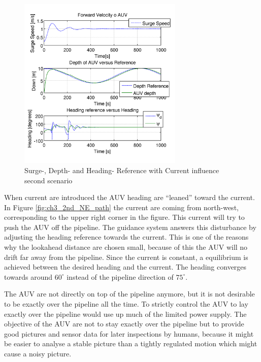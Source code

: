 		\begin{figure}[htbp]
			\centering
			\includegraphics[width=0.70\textwidth]{pics/2nd_uDpsi}
			\caption{Surge-, Depth- and Heading- Reference with Current influence second scenario}
			\label{fig:ch3_2nd_uDpsi}
		\end{figure}
		When current are introduced the AUV heading are ``leaned'' toward the current. In Figure
		\ref{fig:ch3_2nd_NE_path} the current are coming from north-west, corresponding to
		the upper right corner in the figure. This current will try to push the
		AUV off the pipeline. The guidance system answers this disturbance by adjusting the heading
		reference towards the current. This is one of the reasons why the lookahead distance are
		chosen small, because of this the AUV will no drift far away from the pipeline. Since the
		current is constant, a equilibrium is achieved between the desired heading and the
		current. The heading converges towards around $60^{\circ}$ instead of the pipeline direction
		of $75^{\circ}$.

		The AUV are not directly on top of the pipeline anymore, but it is not desirable to be exactly
		over the pipeline all the time. To strictly control the AUV to lay exactly over the pipeline
		would use up much of the limited power supply. The objective of the AUV are not to stay
		exactly over the pipeline but to provide good pictures and sensor data for later inspections 
		by humans, because it might be easier to analyse a stable picture than a tightly regulated
		motion which might cause a noisy picture. 

	


